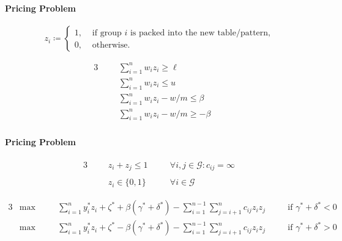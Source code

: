 \documentclass{beamer}
\newcommand{\AutoSectionTitle}{}
\begin{document}


\begin{frame}
  \frametitle{\AutoSectionTitle}
  \framesubtitle{Pricing Problem}

  \begin{equation*}
    z_{i}\coloneqq
    \begin{cases}
      1, &\mbox{ if group $i$ is packed into the new table/pattern,} \\
      0, &\mbox{ otherwise.}
    \end{cases}
  \end{equation*}

  \pause

  \begin{alignat*}{3}
    &&& \sum \limits_{i=1}^{n} w_{i} z_{i} \geq \ell && \\
    &&& \sum \limits_{i=1}^{n} w_{i} z_{i} \leq u && \\
    &&& \sum \limits_{i=1}^{n} w_{i} z_{i} - w/m \leq \beta && \\
    &&& \sum \limits_{i=1}^{n} w_{i} z_{i} - w/m \geq -\beta &&
  \end{alignat*}
  
\end{frame}




\begin{frame}
  \frametitle{\AutoSectionTitle}
  \framesubtitle{Pricing Problem}
  
  \begin{alignat*}{3}
    &&& z_{i} + z_{j} \leq 1 && \quad \forall i,j \in \mathcal{G}:c_{ij}=\infty \\~\\
    &&& z_{i} \in \{0, 1\} && \quad \forall i \in \mathcal{G}
  \end{alignat*}

  \pause
  
  \begin{alignat*}{3}
    & \max \quad && \sum \limits_{i=1}^{n} y_{i}^{*}z_{i} + \zeta^{*} + \beta(\gamma^{*}+\delta^{*}) - \sum \limits_{i=1}^{n-1} \sum \limits_{j=i+1}^{n} c_{ij} z_{i} z_{j} && \quad \text{if } \gamma^{*}+\delta^{*}<0 \\
    & \max \quad && \sum \limits_{i=1}^{n} y_{i}^{*}z_{i} + \zeta^{*} - \beta(\gamma^{*}+\delta^{*}) - \sum \limits_{i=1}^{n-1} \sum \limits_{j=i+1}^{n} c_{ij} z_{i} z_{j} && \quad \text{if } \gamma^{*}+\delta^{*}>0
  \end{alignat*}
  
\end{frame}
\end{document}
